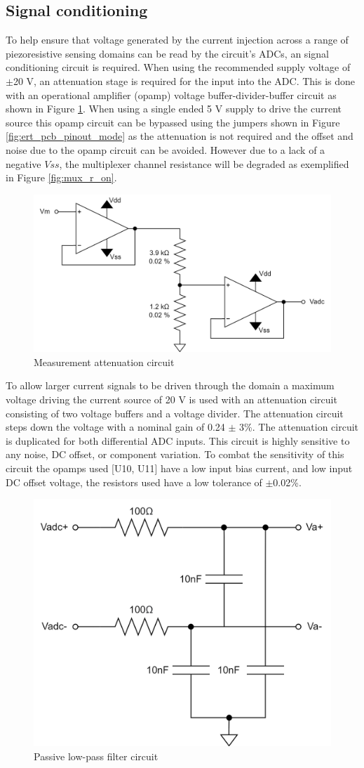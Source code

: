 \subsection{Signal conditioning}
To help ensure that voltage generated by the current injection across a range of piezoresistive sensing domains can be read by the circuit's ADCs, an signal conditioning circuit is required.
When using the recommended supply voltage of $\pm$20 V, an attenuation stage is required for the input into the ADC. This is done with an operational amplifier (opamp) voltage buffer-divider-buffer circuit as shown in Figure \ref{fig:opamp_ckt}. When using a single ended 5 V supply to drive the current source this opamp circuit can be bypassed using the jumpers shown in Figure \ref{fig:ert_pcb_pinout_mode} as the attenuation is not required and the offset and noise due to the opamp circuit can be avoided. However due to a lack of a negative $Vss$, the multiplexer channel resistance will be degraded as exemplified in Figure \ref{fig:mux_r_on}.
\begin{figure}[H]
\centering
\includegraphics[width=0.5\linewidth]{Figures/opamp_ckt_ert_pcb.png}
\caption{Measurement attenuation circuit}
\label{fig:opamp_ckt}
\end{figure}
To allow larger current signals to be driven through the domain a maximum voltage driving the current source of 20 V is used with an attenuation circuit consisting of two voltage buffers and a voltage divider. The attenuation circuit steps down the voltage with a nominal gain of 0.24 $\pm$ 3\%. The attenuation circuit is duplicated for both differential ADC inputs. This circuit is highly sensitive to any noise, DC offset, or component variation. To combat the sensitivity of this circuit the opamps used [U10, U11] have a low input bias current, and low input DC offset voltage, the resistors used have a low tolerance of $\pm$0.02\%.
\begin{figure}[H]
\centering
\includegraphics[width=0.4\linewidth]{Figures/adc_filter_ckt.png}
\caption{Passive low-pass filter circuit}
\label{fig:adc_filter_ckt}
\end{figure}

